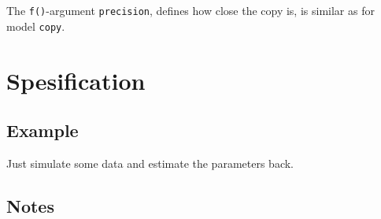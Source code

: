 \documentclass[a4paper,11pt]{article}
\begin{document}
The \texttt{f()}-argument \texttt{precision}, defines how close the
copy is, is similar as for model \texttt{copy}.

\section*{Spesification}



\subsection*{Example}

Just simulate some data and estimate the parameters back. 

{\small}

\subsection*{Notes}
\end{document}
